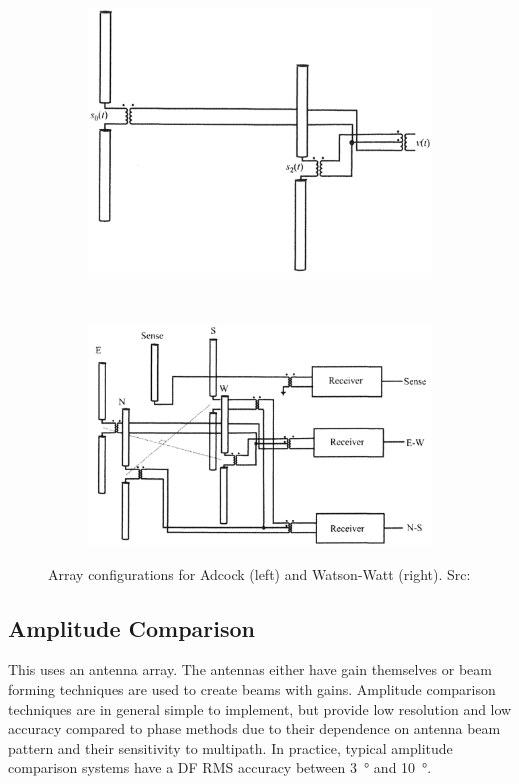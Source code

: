 \begin{figure}
  \centering
  \begin{subfigure}[b]{0.4\textwidth}
    \includegraphics[width=\textwidth]{./img/lit_review/adcock}
  \end{subfigure}
  ~
  \begin{subfigure}[b]{0.5\textwidth}
    \includegraphics[width=\textwidth]{./img/lit_review/watson_watt}
  \end{subfigure}
  \caption{Array configurations for Adcock (left) and Watson-Watt (right). Src: \cite{poisel2008introduction}}
  \label{fig:lit_adcock_and_watsonwatt}
\end{figure}

\subsection{Amplitude Comparison}
This uses an antenna array. The antennas either have gain themselves or beam forming techniques are used to create beams with gains. Amplitude comparison techniques are in general simple to implement, but provide low resolution and low accuracy compared to phase methods due to their dependence on antenna beam pattern and their sensitivity to multipath. In practice, typical amplitude comparison systems have a DF RMS accuracy between \SI{3}{\degree} and \SI{10}{\degree}.
